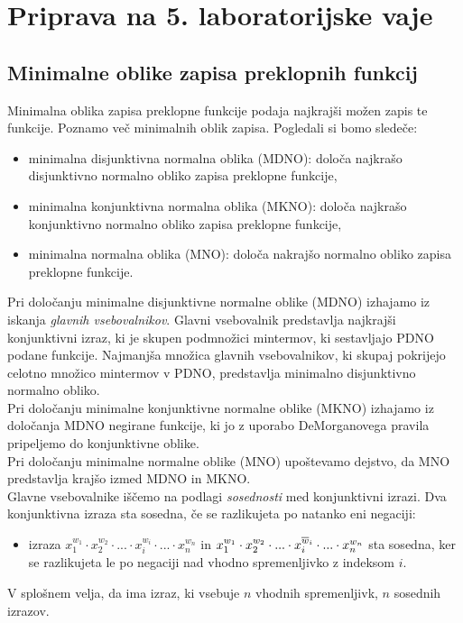 \chapter{Priprava na 5. laboratorijske vaje}
\section{Minimalne oblike zapisa preklopnih funkcij}

Minimalna oblika zapisa preklopne funkcije podaja najkrajši možen zapis te funkcije. Poznamo več minimalnih oblik zapisa. Pogledali si bomo sledeče:
\begin{itemize}
\item minimalna disjunktivna normalna oblika (MDNO): določa najkrašo disjunktivno normalno obliko zapisa preklopne funkcije,
\item minimalna konjunktivna normalna oblika (MKNO): določa najkrašo konjunktivno normalno obliko zapisa preklopne funkcije,
\item minimalna normalna oblika (MNO): določa nakrajšo normalno obliko zapisa preklopne funkcije.
\end{itemize}

Pri določanju minimalne disjunktivne normalne oblike (MDNO) izhajamo iz iskanja \emph{glavnih vsebovalnikov}. Glavni vsebovalnik predstavlja najkrajši konjunktivni izraz, ki je skupen podmnožici mintermov, ki sestavljajo PDNO podane funkcije. Najmanjša množica glavnih vsebovalnikov, ki skupaj pokrijejo celotno množico mintermov v PDNO, predstavlja minimalno disjunktivno normalno obliko.\\

Pri določanju minimalne konjunktivne normalne oblike (MKNO) izhajamo iz določanja MDNO negirane funkcije, ki jo z uporabo DeMorganovega pravila pripeljemo do konjunktivne oblike.\\

Pri določanju minimalne normalne oblike (MNO) upoštevamo dejstvo, da MNO predstavlja krajšo izmed MDNO in MKNO.\\

Glavne vsebovalnike iščemo na podlagi \emph{sosednosti} med konjunktivni izrazi. Dva konjunktivna izraza sta sosedna, če se razlikujeta po natanko eni negaciji:
\begin{itemize}
\item izraza $x_{1}^{w_1} \cdot x_{2}^{w_2} \cdot ... \cdot x_{i}^{w_i} \cdot ... \cdot x_{n}^{w_n}$ in $x_{1}^{w_1} \cdot x_{2}^{w_2} \cdot ... \cdot x_{i}^{\overline w_i} \cdot ... \cdot x_{n}^{w_n}$ sta sosedna, ker se razlikujeta le po negaciji nad vhodno spremenljivko z indeksom $i$.
\end{itemize}
V splošnem velja, da ima izraz, ki vsebuje $n$ vhodnih spremenljivk, $n$ sosednih izrazov.

